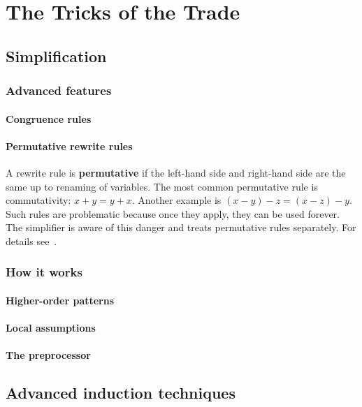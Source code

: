 \chapter{The Tricks of the Trade}

\section{Simplification}

\subsection{Advanced features}

\subsubsection{Congruence rules}


\subsubsection{Permutative rewrite rules}

A rewrite rule is \textbf{permutative} if the left-hand side and right-hand
side are the same up to renaming of variables.  The most common permutative
rule is commutativity: $x+y = y+x$.  Another example is $(x-y)-z = (x-z)-y$.
Such rules are problematic because once they apply, they can be used forever.
The simplifier is aware of this danger and treats permutative rules
separately. For details see~\cite{isabelle-ref}.



\subsection{How it works}
\label{sec:SimpHow}

\subsubsection{Higher-order patterns}

\subsubsection{Local assumptions}

\subsubsection{The preprocessor}



\section{Advanced induction techniques}
\label{sec:advanced-ind}

